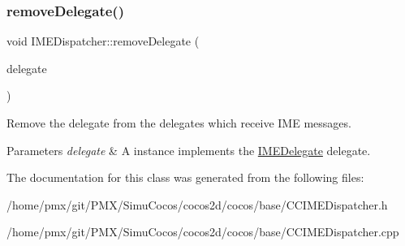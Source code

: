\subsubsection{\texorpdfstring{remove\+Delegate()}{removeDelegate()}\hspace{0.1cm}{\footnotesize\ttfamily [2/2]}}
{\footnotesize\ttfamily void I\+M\+E\+Dispatcher\+::remove\+Delegate (\begin{DoxyParamCaption}\item[{\hyperlink{classIMEDelegate}{I\+M\+E\+Delegate} $\ast$}]{delegate }\end{DoxyParamCaption})\hspace{0.3cm}{\ttfamily [protected]}}



Remove the delegate from the delegates which receive I\+ME messages. 


\begin{DoxyParams}{Parameters}
{\em delegate} & A instance implements the \hyperlink{classIMEDelegate}{I\+M\+E\+Delegate} delegate. \\
\hline
\end{DoxyParams}


The documentation for this class was generated from the following files\+:\begin{DoxyCompactItemize}
\item 
/home/pmx/git/\+P\+M\+X/\+Simu\+Cocos/cocos2d/cocos/base/C\+C\+I\+M\+E\+Dispatcher.\+h\item 
/home/pmx/git/\+P\+M\+X/\+Simu\+Cocos/cocos2d/cocos/base/C\+C\+I\+M\+E\+Dispatcher.\+cpp\end{DoxyCompactItemize}
